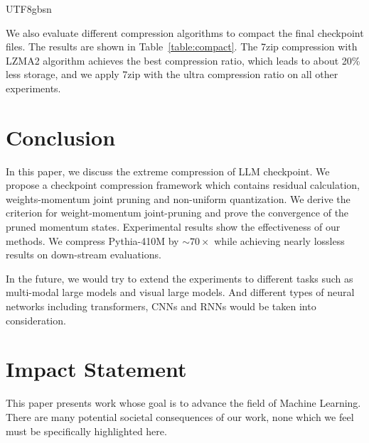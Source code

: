 \documentclass{article}
\theoremstyle{plain}
\theoremstyle{definition}
\theoremstyle{remark}
\begin{document}
\begin{CJK}{UTF8}{gbsn}
\begin{table}[t]
\vspace{-15pt}
\label{table:compact}
\end{table}

We also evaluate different compression algorithms to compact the final checkpoint files. The results are shown in Table~\ref{table:compact}. The 7zip compression with LZMA2 algorithm achieves the best compression ratio, which leads to about 20\% less storage, and we apply 7zip with the ultra compression ratio on all other experiments.


\section{Conclusion}
\label{sec:conclusion}
In this paper, we discuss the extreme compression of LLM checkpoint. We propose a checkpoint compression framework which contains residual calculation, weights-momentum joint pruning and non-uniform quantization. We derive the criterion for weight-momentum joint-pruning and prove the convergence of the pruned momentum states. Experimental results show the effectiveness of our methods. We compress Pythia-410M by $\sim70\times$ while achieving nearly lossless results on down-stream evaluations.

In the future, we would try to extend the experiments to different tasks such as multi-modal large models and visual large models. And different types of neural networks including transformers, CNNs and RNNs would be taken into consideration.


\section*{Impact Statement}
This paper presents work whose goal is to advance the field of Machine Learning. There are many potential societal consequences of our work, none which we feel must be specifically highlighted here.



\newpage
\appendix
\onecolumn


\end{CJK}
\end{document}
